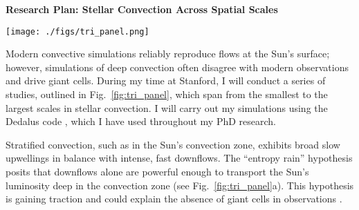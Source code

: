 \documentclass[onecolumn, 11pt, hmargin=1in, vmargin=1in]{aastex62}
\begin{document}
\begin{center}
\vspace{-5pt}
\textbf{Research Plan: Stellar Convection Across Spatial Scales}
\vspace{-8pt}
\end{center}
\begin{figure*}[b]
	\begin{center}
	\vspace{-8pt}
    \texttt{[image: ./figs/tri\_panel.png]}
	\vspace{-8pt}
    \caption{ 
	(a) A schematic of the interior of Sun-like stars under the entropy rain hypothesis, where cold droplets of fluid carry the stellar luminosity below a small traditional convective surface layer.
	The scope of two experiments proposed here are boxed and labeled (``Thermals'' and ``RCB''), and the third experiment proposed here would contain the full spherical volume of the star, from which this wedge is taken.
	(b) A 3D visualization of entropy perturbations within the downward-propagating reference frame of a turbulent ``thermal,'' which models a stellar downflow.
	(c) A schematic of the radiative-convective boundary (RCB), where downflows impinge upon a stable layer and excite gravity waves within that layer.
	\label{fig:tri_panel} }
	\end{center}
\end{figure*}


Modern convective simulations reliably reproduce flows at the Sun's surface; however, simulations of deep convection often disagree with modern observations and drive giant cells.
During my time at Stanford, I will conduct a series of studies, outlined in Fig.~\ref{fig:tri_panel}, which span from the smallest to the largest scales in stellar convection.
I will carry out my simulations using the Dedalus code \citep{burns&all2019}, which I have used throughout my PhD research.

Stratified convection, such as in the Sun's convection zone, exhibits broad slow upwellings in balance with intense, fast downflows.
The ``entropy rain'' hypothesis posits that downflows alone are powerful enough to transport the Sun's luminosity deep in the convection zone (see Fig.~\ref{fig:tri_panel}a).
This hypothesis is gaining traction \citep{brandenburg2016, kapyla&all2017} and could explain the absence of giant cells in observations \citep{hanasoge&all2015}.
\end{document}
